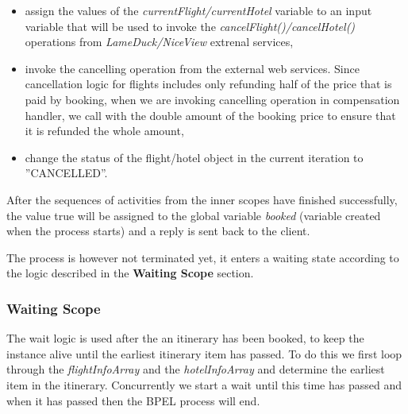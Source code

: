 \begin{itemize}
\item assign the values of the \textit{currentFlight/currentHotel} variable to an input variable that will be used to invoke the \textit{cancelFlight()/cancelHotel()} operations from \textit{LameDuck/NiceView} extrenal services,
\item invoke the cancelling operation from the external web services. Since cancellation logic for flights includes only refunding half of the price that is paid by booking, when we are invoking cancelling operation in compensation handler, we call with the double amount of the booking price to ensure that it is refunded the whole amount,
\item change the status of the flight/hotel object in the current iteration to ''CANCELLED''.
\end{itemize}

After the sequences of activities from the inner scopes have finished successfully, the value true will be assigned to the global variable \textit{booked} (variable created when the process starts) and a reply is sent back to the client. 

The process is however not terminated yet, it enters a waiting state according to the logic described in the \textbf{Waiting Scope} section.

\subsubsection*{Waiting Scope}

The wait logic is used after the an itinerary has been booked, to keep the instance alive until the earliest itinerary item has passed. To do this we first loop through the \textit{flightInfoArray} and the \textit{hotelInfoArray} and determine the earliest item in the itinerary. Concurrently we start a wait until this time has passed and when it has passed then the BPEL process will end.





